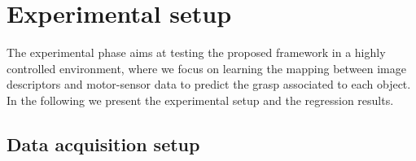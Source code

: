 \section{Experimental setup}
\label{sec::experiments}

The experimental phase aims at testing the proposed framework in a highly controlled environment, where we focus on learning the mapping between image descriptors and motor-sensor data to predict the grasp associated to each object. In the following we present the experimental setup and the regression results.

\subsection{Data acquisition setup}
\label{sec::acquisition}

